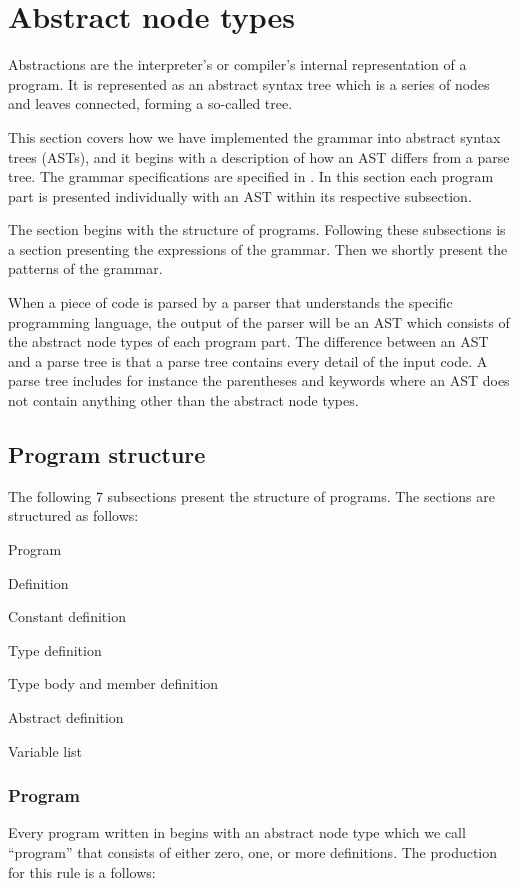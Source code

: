 \section{Abstract node types}
\label{sec:ant}

Abstractions are the interpreter's or compiler's internal representation of a program. It is represented as an abstract syntax tree which is a series of nodes and leaves connected, forming a so-called tree.%

This section covers how we have implemented the grammar into abstract syntax trees (ASTs), and it begins with a description of how an AST differs from a parse tree. 
The grammar specifications are specified in . In this section each program part is presented individually with an AST within its respective subsection. 

The section begins with the structure of programs. Following these subsections is a section presenting the expressions of the grammar. Then we shortly present the patterns of the grammar.

When a piece of code is parsed by a parser that understands the specific programming language, the output of the parser will be an AST which consists of the abstract node types of each program part. The difference between an AST and a parse tree is that a parse tree contains every detail of the input code. A parse tree includes for instance the parentheses and keywords where an AST does not contain anything other than the abstract node types.\cite{parsevsast}%

\subsection{Program structure}
The following 7 subsections present the structure of programs. The sections are structured as follows:

\begin{dlist}
\item Program
\item Definition
\item Constant definition
\item Type definition
\item Type body and member definition
\item Abstract definition
\item Variable list
\end{dlist}

\subsubsection{Program}%
Every program written in \productname{} begins with an abstract node type which we call ``program'' that consists of either zero, one, or more definitions. The production for this rule is a follows:%

